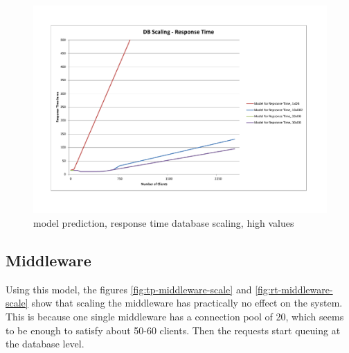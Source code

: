 \documentclass[a4paper]{article}
\begin{document}
\begin{landscape}
\begin{figure}[H]
	\begin{center}
    \includegraphics[scale=0.7, trim = 23mm 28mm 24mm 24mm, clip]{measurements_increase_load/rt_db_scale2.pdf}
  \end{center}
  \caption{model prediction, response time database scaling, high values}
  \label{fig:rt-db-scale2}
\end{figure}


\end{landscape}



\subsection{Middleware}

Using this model, the figures \ref{fig:tp-middleware-scale} and \ref{fig:rt-middleware-scale} show that scaling the middleware has practically no effect on the system. This is because one single middleware has a connection pool of 20, which seems to be enough to satisfy about 50-60 clients. Then the requests start queuing at the database level.\\
\end{document}
